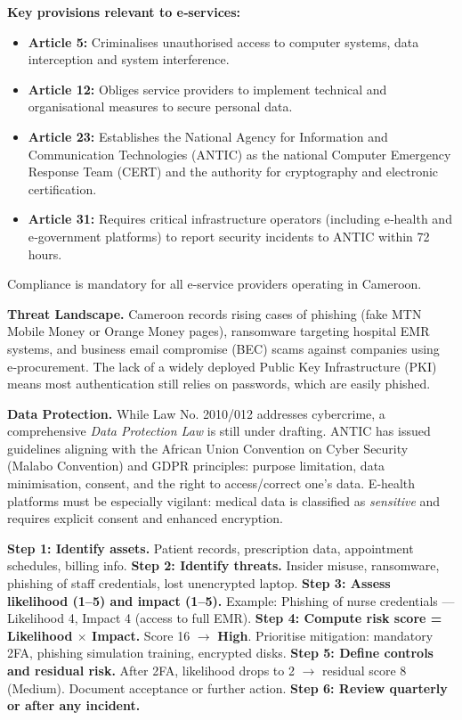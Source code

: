\documentclass[11pt]{article}
\newcommand{\cle}[1]{{\popxbold\color{popdark}#1}}
\begin{document}
\begin{propriete}
\textbf{Key provisions relevant to e‑services:}
\begin{itemize}
\item \textbf{Article 5:} Criminalises unauthorised access to computer systems, data interception and system interference.
\item \textbf{Article 12:} Obliges service providers to implement technical and organisational measures to secure personal data.
\item \textbf{Article 23:} Establishes the \cle{National Agency for Information and Communication Technologies (ANTIC)} as the national Computer Emergency Response Team (CERT) and the authority for cryptography and electronic certification.
\item \textbf{Article 31:} Requires critical infrastructure operators (including e‑health and e‑government platforms) to report security incidents to ANTIC within 72 hours.
\end{itemize}
Compliance is mandatory for all e‑service providers operating in Cameroon.
\end{propriete}

\textbf{Threat Landscape.} Cameroon records rising cases of phishing (fake MTN Mobile Money or Orange Money pages), ransomware targeting hospital EMR systems, and business email compromise (BEC) scams against companies using e‑procurement. The lack of a widely deployed \cle{Public Key Infrastructure (PKI)} means most authentication still relies on passwords, which are easily phished.

\textbf{Data Protection.} While Law No. 2010/012 addresses cybercrime, a comprehensive \emph{Data Protection Law} is still under drafting. ANTIC has issued guidelines aligning with the African Union Convention on Cyber Security (Malabo Convention) and GDPR principles: purpose limitation, data minimisation, consent, and the right to access/correct one’s data. E‑health platforms must be especially vigilant: medical data is classified as \emph{sensitive} and requires explicit consent and enhanced encryption.

\begin{methode}
\textbf{Step 1: Identify assets.} Patient records, prescription data, appointment schedules, billing info.
\textbf{Step 2: Identify threats.} Insider misuse, ransomware, phishing of staff credentials, lost unencrypted laptop.
\textbf{Step 3: Assess likelihood (1–5) and impact (1–5).} Example: Phishing of nurse credentials — Likelihood 4, Impact 4 (access to full EMR).
\textbf{Step 4: Compute risk score = Likelihood $\times$ Impact.} Score 16 $\rightarrow$ \textbf{High}. Prioritise mitigation: mandatory 2FA, phishing simulation training, encrypted disks.
\textbf{Step 5: Define controls and residual risk.} After 2FA, likelihood drops to 2 $\rightarrow$ residual score 8 (Medium). Document acceptance or further action.
\textbf{Step 6: Review quarterly or after any incident.}
\end{methode}
\end{document}
